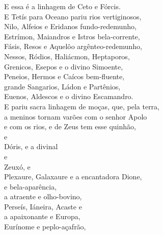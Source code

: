 \begin{pages}
\begin{Rightside}
E essa é a linhagem de Ceto e Fórcis.\\
E Tetís para Oceano pariu rios vertiginosos,\\
Nilo, Alfeios e Eridanos fundo-redemunho,\\
Estrímon, Maiandros e Istros bela-corrente,\\
Fásis, Resos e Aquelôo argênteo-redemunho, \\
Nessos, Ródios, Haliácmon, Heptaporos,\\
Grenicos, Esepos e o divino Simoente,\\
Peneios, Hermos e Caícos bem-fluente,\\
grande Sangarios, Ládon e Partênios,\\
Euenos, Aldescos e o divino Escamandro. \\
E pariu sacra linhagem de moças, que, pela terra,\\
a meninos tornam varões com o senhor Apolo\\
e com os rios, e de Zeus tem esse quinhão,\\
   e \\
Dóris,  e a divinal  \\
   e \\
Zeuxó,   e \\
Plexaure, Galaxaure e a encantadora Dione,\\
  e  bela-aparência,\\
a atraente  e  olho-bovino,\\ 
Perseís, Iáneira, Acaste e \\
a apaixonante   e Europa,\\
 Eurínome e  peplo-açafrão,\\

\end{Rightside}
\end{pages}
